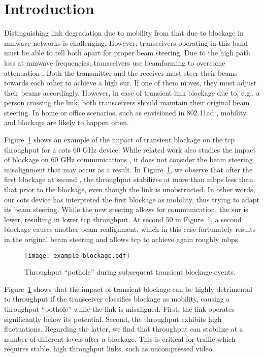 \documentclass{article}
\begin{document}
\section{Introduction}
\label{sec:intro}

Distinguishing link degradation due to mobility from that due to blockage in \ac{mmwave} networks is challenging. However, transceivers operating in this band must be able to tell both apart for proper beam steering. Due to the high path loss at \ac{mmwave} frequencies, transceivers use beamforming to overcome attenuation \cite{challenges60Ghz}. Both the transmitter and the receiver must steer their beams towards each other to achieve a high \ac{snr}. If one of them moves, they must adjust their beams accordingly. However, in case of transient link blockage due to, e.g., a person crossing the link, both transceivers should maintain their original beam steering. In home or office scenarios, such as envisioned in 802.11ad \cite{ad_standard}, mobility and blockage are likely to happen often.

Figure~\ref{fig:example_blockage} shows an example of the impact of transient blockage on the \ac{tcp} throughput for a \ac{cots} 60 GHz device. While related work also studies the impact of blockage on 60 GHz communications \cite{Zhu2014Mobicom, measurements_blockage}, it does not consider the beam steering misalignment that may occur as a result. In Figure~\ref{fig:example_blockage}, we observe that after the first blockage at second , the throughput stabilizes at more than  mbps less than that prior to the blockage, even though the link is unobstructed. In other words, our \ac{cots} device has interpreted the first blockage as mobility, thus trying to adapt its beam steering. While the new steering allows for communication, the \ac{snr} is lower, resulting in lower \ac{tcp} throughput. At second 50 in Figure~\ref{fig:example_blockage}, a second blockage causes another beam realignment, which in this case fortunately results in the original beam steering and allows \ac{tcp} to achieve again roughly  mbps.
\begin{figure}
	\centering
		\texttt{[image: example\_blockage.pdf]}		
	\caption{Throughput ``pothole'' during subsequent transient blockage events.}
	\label{fig:example_blockage}	
\end{figure}
Figure~\ref{fig:example_blockage} shows that the impact of transient blockage can be highly detrimental to throughput if the transceiver classifies blockage as mobility, causing a throughput ``pothole'' while the link is misaligned. First, the link operates significantly below its potential. Second, the throughput exhibits high fluctuations. Regarding the latter, we find that throughput can stabilize at a number of different levels after a blockage. This is critical for traffic which requires stable, high throughput links, such as uncompressed video.
\end{document}
